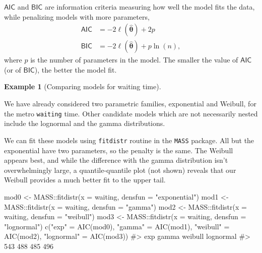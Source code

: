 \documentclass[
  11pt,
  letterpaper,
]{scrbook}
\newenvironment{Shaded}{\begin{snugshade}}{\end{snugshade}}
\newcommand{\AttributeTok}[1]{\textcolor[rgb]{0.40,0.45,0.13}{#1}}
\newcommand{\CommentTok}[1]{\textcolor[rgb]{0.37,0.37,0.37}{#1}}
\newcommand{\FunctionTok}[1]{\textcolor[rgb]{0.28,0.35,0.67}{#1}}
\newcommand{\NormalTok}[1]{\textcolor[rgb]{0.00,0.23,0.31}{#1}}
\newcommand{\OtherTok}[1]{\textcolor[rgb]{0.00,0.23,0.31}{#1}}
\newcommand{\SpecialCharTok}[1]{\textcolor[rgb]{0.37,0.37,0.37}{#1}}
\newcommand{\StringTok}[1]{\textcolor[rgb]{0.13,0.47,0.30}{#1}}
\theoremstyle{plain}
\theoremstyle{definition}
\newtheorem{example}{Example}[chapter]
\theoremstyle{definition}
\theoremstyle{plain}
\theoremstyle{remark}
\begin{document}
\(\mathsf{AIC}\) and \(\mathsf{BIC}\) are information criteria measuring
how well the model fits the data, while penalizing models with more
parameters, \begin{align*}
\mathsf{AIC}&=-2\ell(\widehat{\boldsymbol{\theta}})+2p \\
\mathsf{BIC}&=-2\ell(\widehat{\boldsymbol{\theta}})+p\ln(n),
\end{align*} where \(p\) is the number of parameters in the model. The
smaller the value of \(\mathsf{AIC}\) (or of \(\mathsf{BIC}\)), the
better the model fit.

\begin{example}[Comparing models for waiting
time]\protect\hypertarget{exm-aic}{}\label{exm-aic}

We have already considered two parametric families, exponential and
Weibull, for the metro \texttt{waiting} time. Other candidate models
which are not necessarily nested include the lognormal and the gamma
distributions.

We can fit these models using \texttt{fitdistr} routine in the
\texttt{MASS} package. All but the exponential have two parameters, so
the penalty is the same. The Weibull appears best, and while the
difference with the gamma distribution isn't overwhelmingly large, a
quantile-quantile plot (not shown) reveals that our Weibull provides a
much better fit to the upper tail.

\begin{Shaded}
\begin{Highlighting}[]
\NormalTok{mod0 }\OtherTok{\textless{}{-}}\NormalTok{ MASS}\SpecialCharTok{::}\FunctionTok{fitdistr}\NormalTok{(}\AttributeTok{x =}\NormalTok{ waiting, }\AttributeTok{densfun =} \StringTok{"exponential"}\NormalTok{)}
\NormalTok{mod1 }\OtherTok{\textless{}{-}}\NormalTok{ MASS}\SpecialCharTok{::}\FunctionTok{fitdistr}\NormalTok{(}\AttributeTok{x =}\NormalTok{ waiting, }\AttributeTok{densfun =} \StringTok{"gamma"}\NormalTok{)}
\NormalTok{mod2 }\OtherTok{\textless{}{-}}\NormalTok{ MASS}\SpecialCharTok{::}\FunctionTok{fitdistr}\NormalTok{(}\AttributeTok{x =}\NormalTok{ waiting, }\AttributeTok{densfun =} \StringTok{"weibull"}\NormalTok{)}
\NormalTok{mod3 }\OtherTok{\textless{}{-}}\NormalTok{ MASS}\SpecialCharTok{::}\FunctionTok{fitdistr}\NormalTok{(}\AttributeTok{x =}\NormalTok{ waiting, }\AttributeTok{densfun =} \StringTok{"lognormal"}\NormalTok{)}
\FunctionTok{c}\NormalTok{(}\StringTok{"exp"} \OtherTok{=} \FunctionTok{AIC}\NormalTok{(mod0), }
  \StringTok{"gamma"} \OtherTok{=} \FunctionTok{AIC}\NormalTok{(mod1), }
  \StringTok{"weibull"} \OtherTok{=} \FunctionTok{AIC}\NormalTok{(mod2),}
  \StringTok{"lognormal"} \OtherTok{=} \FunctionTok{AIC}\NormalTok{(mod3))}
\CommentTok{\#\textgreater{}       exp     gamma   weibull lognormal }
\CommentTok{\#\textgreater{}       543       488       485       496}
\end{Highlighting}
\end{Shaded}

\end{example}
\end{document}
